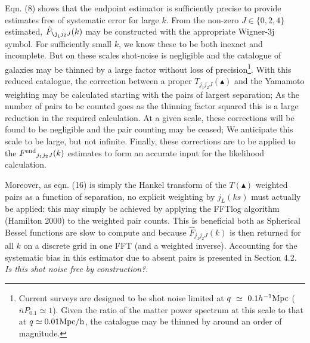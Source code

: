 \documentclass[useAMS,usenatbib]{mn2e}
\begin{document}
Eqn. (8) shows that the endpoint estimator is sufficiently precise to provide estimates free of systematic error for large $k$.  From the non-zero $J \in \{ 0,2,4\}$ estimated, $\hat F_{\j_1 j_2 J}(k)$ may be constructed with the appropriate Wigner-3j symbol.  For sufficiently small $k$, we know these to be both inexact and incomplete. But on these scales shot-noise is negligible and the catalogue of galaxies may be thinned by a large factor without loss of precision\footnote{Current surveys are designed to be shot noise limited at $q~\simeq~0.1 h^{-1} \rm{Mpc}$  ($\bar n P_{0.1} \simeq 1$). Given the ratio of the matter power spectrum at this scale to that at $q\simeq 0.01 \rm{Mpc} / h$, the catalogue may be thinned by around an order of magnitude.}.  With this reduced catalogue, the correction between a proper $T_{j_1 j_2 J}(\blacktriangle)$ and the Yamamoto weighting may be calculated starting with the pairs of largest separation; As the number of pairs to be counted goes as the thinning factor squared this is a large reduction in the required calculation.  At a given scale, these 
corrections will be found to be negligible and the pair counting may be ceased;  We anticipate this scale to be large, but not infinite.  Finally, these corrections are to be applied to the ${F^{\rm{end}}}_{j_1 j_2 J}(k)$ estimates to form an accurate input for the likelihood calculation.

Moreover, as eqn. (16) is simply the Hankel transform of the $T(\blacktriangle)$ weighted pairs as a function of separation, no explicit weighting by $j_L(ks)$ must actually be applied:  this may simply be achieved by applying the FFTlog algorithm (Hamilton 2000) to the weighted pair counts.  This is beneficial both as Spherical Bessel functions are slow to compute and because $\hat F_{j_1 j_2 J}(k)$ is then returned for all $k$ on a discrete grid in one FFT (and a weighted inverse).  Accounting for the systematic bias in this estimator due to absent pairs is  presented in Section 4.2. \emph{Is this shot noise free by construction?}.
\end{document}
